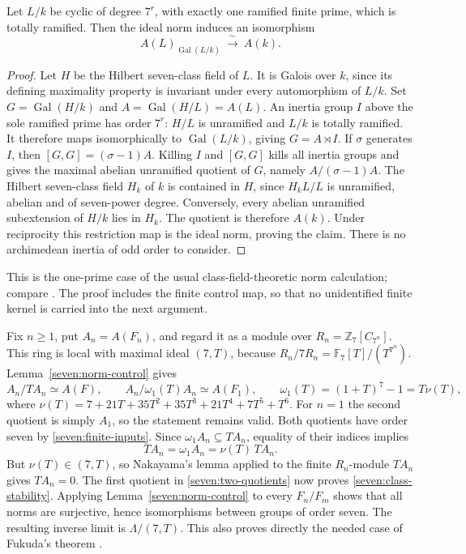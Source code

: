 \begin{lemma}\label{seven:norm-control}
Let $L/k$ be cyclic of degree $7^r$, with exactly one ramified finite prime,
which is totally ramified. Then the ideal norm induces an isomorphism
\[
 A(L)_{\operatorname{Gal}(L/k)}\ \xrightarrow{\ \sim\ }\ A(k).
 \tag{S29}\label{seven:coinvariant-control}
\]
\end{lemma}

\begin{proof}
Let $H$ be the Hilbert seven-class field of $L$. It is Galois over $k$,
since its defining maximality property is invariant under every
automorphism of $L/k$. Set
$G=\operatorname{Gal}(H/k)$ and
$A=\operatorname{Gal}(H/L)=A(L)$.
An inertia group $I$ above the sole ramified prime has order $7^r$:
$H/L$ is unramified and $L/k$ is totally ramified.
It therefore maps isomorphically to $\operatorname{Gal}(L/k)$, giving
$G=A\rtimes I$.
If $\sigma$ generates $I$, then $[G,G]=(\sigma-1)A$.
Killing $I$ and $[G,G]$ kills all inertia groups and gives the maximal
abelian unramified quotient of $G$, namely $A/(\sigma-1)A$.
The Hilbert seven-class field $H_k$ of $k$ is contained in $H$, since
$H_kL/L$ is unramified, abelian and of seven-power degree. Conversely,
every abelian unramified subextension of $H/k$ lies in $H_k$.
The quotient is therefore $A(k)$.
Under reciprocity this restriction map is the ideal norm, proving the
claim. There is no archimedean inertia of odd order to consider.
\end{proof}

This is the one-prime case of the usual class-field-theoretic norm
calculation; compare
\cite[Corollaries~1.3.9 and 1.3.12]{sevenSharifi}.
The proof includes the finite control map, so that no unidentified
finite kernel is carried into the next argument.

Fix $n\ge1$, put $A_n=A(F_n)$, and regard it as a module over
$R_n=\mathbb Z_7[C_{7^n}]$.
This ring is local with maximal ideal $(7,T)$, because
$R_n/7R_n=\mathbb F_7[T]/(T^{7^n})$.
Lemma~\ref{seven:norm-control} gives
\[
 A_n/TA_n\simeq A(F),\qquad
 A_n/\omega_1(T)A_n\simeq A(F_1),\qquad
 \omega_1(T)=(1+T)^7-1=T\nu(T),
 \tag{S30}\label{seven:two-quotients}
\]
where
$\nu(T)=7+21T+35T^2+35T^3+21T^4+7T^5+T^6$.
For $n=1$ the second quotient is simply $A_1$, so the statement remains
valid. Both quotients have order seven by \eqref{seven:finite-inputs}.
Since $\omega_1A_n\subseteq TA_n$, equality of their indices implies
\[
 TA_n=\omega_1A_n=\nu(T)\,TA_n.
\]
But $\nu(T)\in(7,T)$, so Nakayama's lemma applied to the finite
$R_n$-module $TA_n$ gives $TA_n=0$.
The first quotient in \eqref{seven:two-quotients} now proves
\eqref{seven:class-stability}.
Applying Lemma~\ref{seven:norm-control} to every $F_n/F_m$ shows that all
norms are surjective, hence isomorphisms between groups of order seven.
The resulting inverse limit is $\Lambda/(7,T)$.
This also proves directly the needed case of Fukuda's theorem
\cite[Theorem~1(1)]{sevenFukuda1994}.

